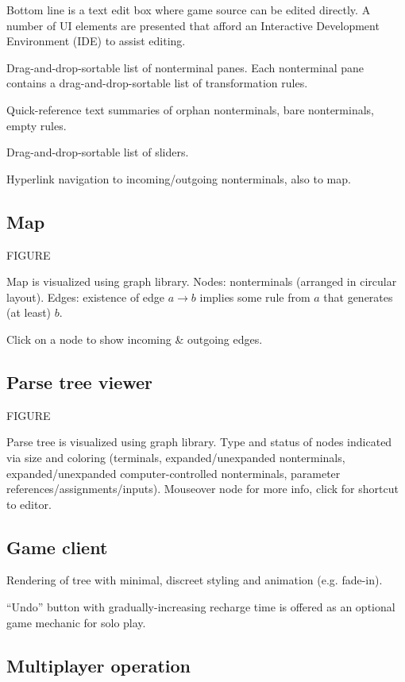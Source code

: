 \documentclass{acm_proc_article-sp}
\begin{document}
Bottom line is a text edit box where game source can be edited directly.
A number of UI elements are presented that afford an Interactive Development Environment (IDE) to assist editing.

Drag-and-drop-sortable list of nonterminal panes.
Each nonterminal pane contains a drag-and-drop-sortable list of transformation rules.

Quick-reference text summaries of orphan nonterminals, bare nonterminals, empty rules.

Drag-and-drop-sortable list of sliders.

Hyperlink navigation to incoming/outgoing nonterminals, also to map.

\subsection{Map}

FIGURE

Map is visualized using graph library.
Nodes: nonterminals (arranged in circular layout).
Edges: existence of edge $a \to b$ implies some rule from $a$ that generates (at least) $b$.

Click on a node to show incoming \& outgoing edges.

\subsection{Parse tree viewer}

FIGURE

Parse tree is visualized using graph library.
Type and status of nodes indicated via size and coloring (terminals, expanded/unexpanded nonterminals, expanded/unexpanded computer-controlled nonterminals, parameter references/assignments/inputs).
Mouseover node for more info, click for shortcut to editor.

\subsection{Game client}

Rendering of tree with minimal, discreet styling and animation (e.g. fade-in).

``Undo'' button with gradually-increasing recharge time is offered as an optional game mechanic for solo play.

\subsection{Multiplayer operation}
\end{document}
